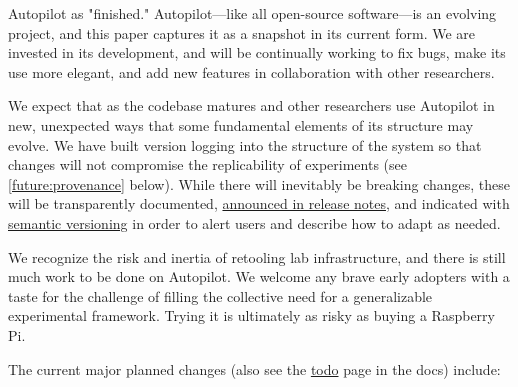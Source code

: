 


 Autopilot as "finished." Autopilot---like all open-source software---is an evolving project, and this paper captures it as a snapshot in its current form. We are invested in its development, and will be continually working to fix bugs, make its use more elegant, and add new features in collaboration with other researchers. 

We expect that as the codebase matures and other researchers use Autopilot in new, unexpected ways that some fundamental elements of its structure may evolve. We have built version logging into the structure of the system so that changes will not compromise the replicability of experiments (see \ref{future:provenance} below). While there will inevitably be breaking changes, these will be transparently documented, \href{https://docs.auto-pi-lot.com/en/latest/changelog/index.html}{announced in release notes}, and indicated with \href{https://semver.org/}{semantic versioning} in order to alert users and describe how to adapt as needed. 

We recognize the risk and inertia of retooling lab infrastructure, and there is still much work to be done on Autopilot. We welcome any brave early adopters with a taste for the challenge of filling the collective need for a generalizable experimental framework. Trying it is ultimately as risky as buying a Raspberry Pi. 

The current major planned changes (also see the \href{https://docs.auto-pi-lot.com/en/latest/todo.html}{todo} page in the docs) include:


